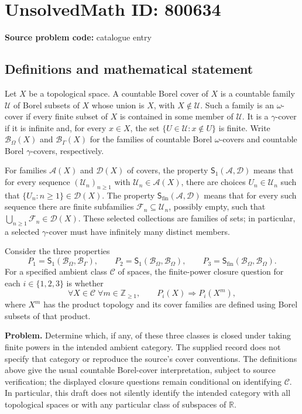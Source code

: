\documentclass[11pt]{article}
\newcommand{\Z}{\mathbb{Z}}
\newcommand{\R}{\mathbb{R}}
\begin{document}
\section*{UnsolvedMath ID: 800634}
\textbf{Source problem code:} catalogue entry
\subsection{Definitions and mathematical statement}
Let \(X\) be a topological space. A countable Borel cover of \(X\) is a countable family \(\mathcal U\) of Borel subsets of \(X\) whose union is \(X\), with \(X\notin\mathcal U\). Such a family is an \(\omega\)-cover if every finite subset of \(X\) is contained in some member of \(\mathcal U\). It is a \(\gamma\)-cover if it is infinite and, for every \(x\in X\), the set \(\{U\in\mathcal U:x\notin U\}\) is finite. Write \(\mathcal B_\Omega(X)\) and \(\mathcal B_\Gamma(X)\) for the families of countable Borel \(\omega\)-covers and countable Borel \(\gamma\)-covers, respectively.

For families \(\mathcal A(X)\) and \(\mathcal D(X)\) of covers, the property \(\mathsf S_1(\mathcal A,\mathcal D)\) means that for every sequence \((\mathcal U_n)_{n\geq1}\) with \(\mathcal U_n\in\mathcal A(X)\), there are choices \(U_n\in\mathcal U_n\) such that \(\{U_n:n\geq1\}\in\mathcal D(X)\). The property \(\mathsf S_{\mathrm{fin}}(\mathcal A,\mathcal D)\) means that for every such sequence there are finite subfamilies \(\mathcal F_n\subseteq\mathcal U_n\), possibly empty, such that \(\bigcup_{n\geq1}\mathcal F_n\in\mathcal D(X)\). These selected collections are families of sets; in particular, a selected \(\gamma\)-cover must have infinitely many distinct members.

Consider the three properties
\[
P_1=\mathsf S_1(\mathcal B_\Omega,\mathcal B_\Gamma),\qquad
P_2=\mathsf S_1(\mathcal B_\Omega,\mathcal B_\Omega),\qquad
P_3=\mathsf S_{\mathrm{fin}}(\mathcal B_\Omega,\mathcal B_\Omega).
\]
For a specified ambient class \(\mathscr C\) of spaces, the finite-power closure question for each \(i\in\{1,2,3\}\) is whether
\[
\forall X\in\mathscr C\;\forall m\in\Z_{\geq1},\qquad
P_i(X)\Longrightarrow P_i(X^m),
\]
where \(X^m\) has the product topology and its cover families are defined using Borel subsets of that product.

\textbf{Problem.} Determine which, if any, of these three classes is closed under taking finite powers in the intended ambient category. The supplied record does not specify that category or reproduce the source's cover conventions. The definitions above give the usual countable Borel-cover interpretation, subject to source verification; the displayed closure questions remain conditional on identifying \(\mathscr C\). In particular, this draft does not silently identify the intended category with all topological spaces or with any particular class of subspaces of \(\R\).
\end{document}
